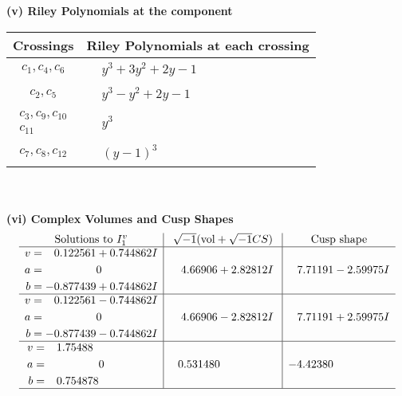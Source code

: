 \documentclass[1p]{elsarticle_modified}
\theoremstyle{definition}
\newcommand{\I}{\sqrt{-1}}
\begin{document}
\newpage\renewcommand{\arraystretch}{1}
\flushleft \textbf{(v) Riley Polynomials at the component}\newline \\
\begin{tabular}{m{50pt}|m{274pt}}
Crossings & \hspace{64pt}Riley Polynomials at each crossing \\
\hline $$\begin{aligned}c_{1},c_{4},c_{6}\end{aligned}$$&$\begin{aligned}
&y^3+3 y^2+2 y-1
\end{aligned}$\\
\hline $$\begin{aligned}c_{2},c_{5}\end{aligned}$$&$\begin{aligned}
&y^3- y^2+2 y-1
\end{aligned}$\\
\hline $$\begin{aligned}c_{3},c_{9},c_{10}\\c_{11}\end{aligned}$$&$\begin{aligned}
&y^3
\end{aligned}$\\
\hline $$\begin{aligned}c_{7},c_{8},c_{12}\end{aligned}$$&$\begin{aligned}
&(y-1)^3
\end{aligned}$\\
\hline
\end{tabular}\\~\\
\newpage\flushleft \textbf{(vi) Complex Volumes and Cusp Shapes}
$$\begin{array}{c|c|c}  
\text{Solutions to }I^v_{1}& \I (\text{vol} + \sqrt{-1}CS) & \text{Cusp shape}\\
 \hline 
\begin{aligned}
v &= \phantom{-}0.122561 + 0.744862 I \\
a &= \phantom{-0.000000 } 0 \\
b &= -0.877439 + 0.744862 I\end{aligned}
 & \phantom{-}4.66906 + 2.82812 I & \phantom{-}7.71191 - 2.59975 I \\ \hline\begin{aligned}
v &= \phantom{-}0.122561 - 0.744862 I \\
a &= \phantom{-0.000000 } 0 \\
b &= -0.877439 - 0.744862 I\end{aligned}
 & \phantom{-}4.66906 - 2.82812 I & \phantom{-}7.71191 + 2.59975 I \\ \hline\begin{aligned}
v &= \phantom{-}1.75488\phantom{ +0.000000I} \\
a &= \phantom{-0.000000 } 0 \\
b &= \phantom{-}0.754878\phantom{ +0.000000I}\end{aligned}
 & \phantom{-}0.531480\phantom{ +0.000000I} & -4.42380\phantom{ +0.000000I}\\
 \hline 
 \end{array}$$\newpage
\end{document}
